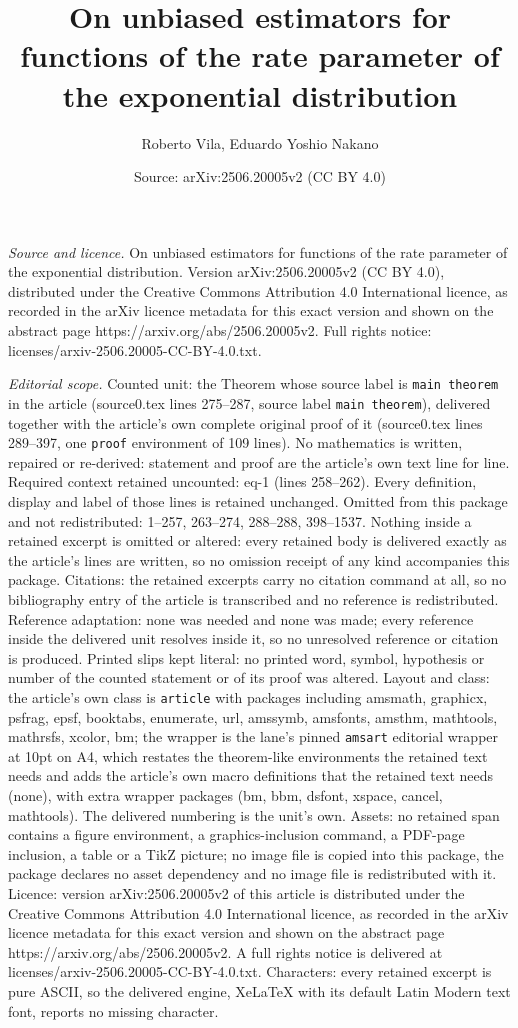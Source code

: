 \documentclass[10pt,a4paper]{amsart}
\title[On unbiased estimators for functions of the rate parameter o]{On unbiased estimators for functions of the rate parameter of the exponential distribution}
\author{Roberto Vila, Eduardo Yoshio Nakano}
\date{Source: arXiv:2506.20005v2 (CC BY 4.0)}
\begin{document}
\maketitle

\noindent\emph{Source and licence.} On unbiased estimators for functions of the rate parameter of the exponential distribution. Version arXiv:2506.20005v2 (CC BY 4.0), distributed under the Creative Commons Attribution 4.0 International licence, as recorded in the arXiv licence metadata for this exact version and shown on the abstract page https://arxiv.org/abs/2506.20005v2. Full rights notice: licenses/arxiv-2506.20005-CC-BY-4.0.txt.\par\smallskip

\noindent\textit{Editorial scope.} Counted unit: the Theorem whose source label is \texttt{main theorem} in the article (source0.tex lines 275--287, source label \texttt{main theorem}), delivered together with the article's own complete original proof of it (source0.tex lines 289--397, one \texttt{proof} environment of 109 lines). No mathematics is written, repaired or re-derived: statement and proof are the article's own text line for line. Required context retained uncounted: eq-1 (lines 258--262). Every definition, display and label of those lines is retained unchanged. Omitted from this package and not redistributed: 1--257, 263--274, 288--288, 398--1537. Nothing inside a retained excerpt is omitted or altered: every retained body is delivered exactly as the article's lines are written, so no omission receipt of any kind accompanies this package. Citations: the retained excerpts carry no citation command at all, so no bibliography entry of the article is transcribed and no reference is redistributed. Reference adaptation: none was needed and none was made; every reference inside the delivered unit resolves inside it, so no unresolved reference or citation is produced. Printed slips kept literal: no printed word, symbol, hypothesis or number of the counted statement or of its proof was altered. Layout and class: the article's own class is \texttt{article} with packages including amsmath, graphicx, psfrag, epsf, booktabs, enumerate, url, amssymb, amsfonts, amsthm, mathtools, mathrsfs, xcolor, bm; the wrapper is the lane's pinned \texttt{amsart} editorial wrapper at 10pt on A4, which restates the theorem-like environments the retained text needs and adds the article's own macro definitions that the retained text needs (none), with extra wrapper packages (bm, bbm, dsfont, xspace, cancel, mathtools). The delivered numbering is the unit's own. Assets: no retained span contains a figure environment, a graphics-inclusion command, a PDF-page inclusion, a table or a TikZ picture; no image file is copied into this package, the package declares no asset dependency and no image file is redistributed with it. Licence: version arXiv:2506.20005v2 of this article is distributed under the Creative Commons Attribution 4.0 International licence, as recorded in the arXiv licence metadata for this exact version and shown on the abstract page https://arxiv.org/abs/2506.20005v2. A full rights notice is delivered at licenses/arxiv-2506.20005-CC-BY-4.0.txt. Characters: every retained excerpt is pure ASCII, so the delivered engine, XeLaTeX with its default Latin Modern text font, reports no missing character.
\end{document}
